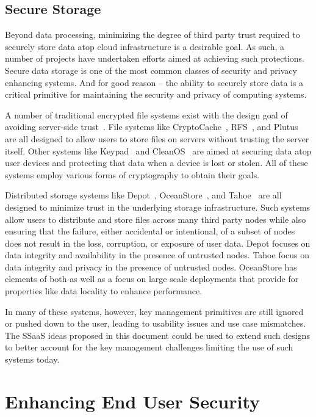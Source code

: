 \subsection{Secure Storage}

Beyond data processing, minimizing the degree of third party trust
required to securely store data atop cloud infrastructure is a
desirable goal. As such, a number of projects have undertaken efforts
aimed at achieving such protections. Secure data storage is one of the
most common classes of security and privacy enhancing systems. And for
good reason -- the ability to securely store data is a critical
primitive for maintaining the security and privacy of computing
systems.

A number of traditional encrypted file systems exist with the design
goal of avoiding server-side trust~\cite{kher2005}. File systems like
CryptoCache~\cite{jensen2000}, RFS~\cite{dong2011}, and
Plutus~\cite{kallahalla2003} are all designed to allow users to store
files on servers without trusting the server itself. Other systems
like Keypad~\cite{geambasu2011} and CleanOS~\cite{tang2012} are aimed
at securing data atop user devices and protecting that data when a
device is lost or stolen. All of these systems employ various forms of
cryptography to obtain their goals.
 
Distributed storage systems like Depot~\cite{mahajan2011},
OceanStore~\cite{kubiatowicz2000}, and Tahoe~\cite{wilcox-o'hearn2008}
are all designed to minimize trust in the underlying storage
infrastructure. Such systems allow users to distribute and store files
across many third party nodes while also ensuring that the failure,
either accidental or intentional, of a subset of nodes does not result
in the loss, corruption, or exposure of user data. Depot focuses on
data integrity and availability in the presence of untrusted
nodes. Tahoe focus on data integrity and privacy in the presence of
untrusted nodes. OceanStore has elements of both as well as a focus on
large scale deployments that provide for properties like data locality
to enhance performance.

In many of these systems, however, key management primitives are still
ignored or pushed down to the user, leading to usability issues and
use case mismatches. The SSaaS ideas proposed in this document could
be used to extend such designs to better account for the key
management challenges limiting the use of such systems today.

\section{Enhancing End User Security}
\label{chap:related:enduser}

